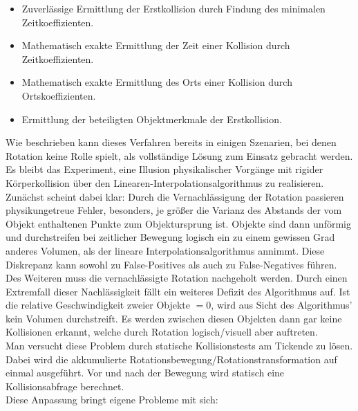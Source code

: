 		\begin{itemize}
			\item Zuverlässige Ermittlung der Erstkollision durch Findung des minimalen Zeitkoeffizienten.
			\item Mathematisch exakte Ermittlung der Zeit einer Kollision durch Zeitkoeffizienten.
			\item Mathematisch exakte Ermittlung des Orts einer Kollision durch Ortskoeffizienten.
			\item Ermittlung der beteiligten Objektmerkmale der Erstkollision.
		\end{itemize}
Wie beschrieben kann dieses Verfahren bereits in einigen Szenarien, bei denen Rotation keine Rolle spielt, als vollständige Lösung zum Einsatz gebracht werden.\\
Es bleibt das Experiment, eine Illusion physikalischer Vorgänge mit rigider Körperkollision über den Linearen-Interpolationsalgorithmus zu realisieren.\\
Zunächst scheint dabei klar: Durch die Vernachlässigung der Rotation passieren physikungetreue Fehler, besonders, je größer die Varianz des Abstands der vom Objekt enthaltenen Punkte zum Objektursprung ist. Objekte sind dann unförmig und durchstreifen bei zeitlicher Bewegung logisch ein zu einem gewissen Grad anderes Volumen, als der lineare Interpolationsalgorithmus annimmt. Diese Diskrepanz kann sowohl zu False-Positives als auch zu False-Negatives führen.\\
Des Weiteren muss die vernachlässigte Rotation nachgeholt werden. Durch einen Extremfall dieser Nachlässigkeit fällt ein weiteres Defizit des Algorithmus auf. Ist die relative Geschwindigkeit zweier Objekte $=0$, wird aus Sicht des Algorithmus' kein Volumen durchstreift. Es werden zwischen diesen Objekten dann gar keine Kollisionen erkannt, welche durch Rotation logisch/visuell aber auftreten.\\
Man versucht diese Problem durch statische Kollisionstests am Tickende zu lösen. Dabei wird die akkumulierte Rotationsbewegung/Rotationstransformation auf einmal ausgeführt. Vor und nach der Bewegung wird statisch eine Kollisionsabfrage berechnet.\\
Diese Anpassung bringt eigene Probleme mit sich:
